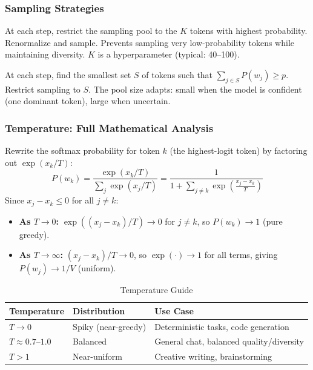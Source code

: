 \documentclass[11pt, a4paper]{article}
\begin{document}
\subsubsection{Sampling Strategies}

\begin{defbox}
At each step, restrict the sampling pool to the $K$ tokens with highest probability. Renormalize and sample. Prevents sampling very low-probability tokens while maintaining diversity. $K$ is a hyperparameter (typical: 40--100).
\end{defbox}

\begin{defbox}
At each step, find the smallest set $S$ of tokens such that $\sum_{j \in S} P(w_j) \geq p$. Restrict sampling to $S$. The pool size adapts: small when the model is confident (one dominant token), large when uncertain.
\end{defbox}

\subsubsection{Temperature: Full Mathematical Analysis}

\begin{mathbox}
Rewrite the softmax probability for token $k$ (the highest-logit token) by factoring out $\exp(x_k / T)$:
\[
P(w_k) = \frac{\exp(x_k/T)}{\sum_j \exp(x_j/T)} = \frac{1}{1 + \sum_{j \neq k} \exp\!\left(\frac{x_j - x_k}{T}\right)}
\]
Since $x_j - x_k \leq 0$ for all $j \neq k$:
\begin{itemize}[leftmargin=1.5em]
  \item \textbf{As $T \to 0$:} $\exp((x_j - x_k)/T) \to 0$ for $j \neq k$, so $P(w_k) \to 1$ (pure greedy).
  \item \textbf{As $T \to \infty$:} $(x_j - x_k)/T \to 0$, so $\exp(\cdot) \to 1$ for all terms, giving $P(w_j) \to 1/V$ (uniform).
\end{itemize}
\end{mathbox}

\begin{table}[h]
\centering
\caption{Temperature Guide}
\begin{tabular}{@{}lll@{}}
\toprule
\textbf{Temperature} & \textbf{Distribution} & \textbf{Use Case} \\
\midrule
$T \to 0$ & Spiky (near-greedy) & Deterministic tasks, code generation \\
$T \approx 0.7$--$1.0$ & Balanced & General chat, balanced quality/diversity \\
$T > 1$ & Near-uniform & Creative writing, brainstorming \\
\bottomrule
\end{tabular}
\end{table}
\end{document}
